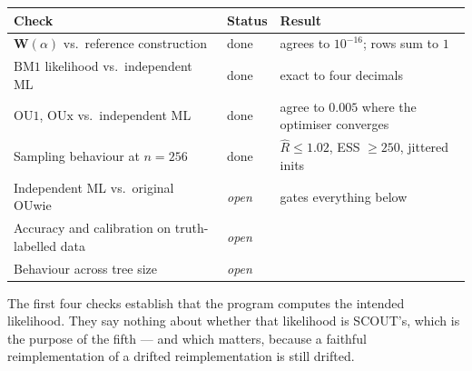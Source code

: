 \documentclass[11pt]{article}
\newcommand{\Wm}{\mathbf{W}}
\newcommand{\BM}{\mathrm{BM1}}
\newcommand{\OUo}{\mathrm{OU1}}
\newcommand{\OUx}{\mathrm{OUx}}
\begin{document}
\begin{center}
\begin{tabular}{@{}llp{6.6cm}@{}}
\toprule
Check & Status & Result \\
\midrule
$\Wm(\alpha)$ vs.\ reference construction & done & agrees to $10^{-16}$; rows sum to $1$ \\
$\BM$ likelihood vs.\ independent ML & done & exact to four decimals \\
$\OUo$, $\OUx$ vs.\ independent ML & done & agree to $0.005$ where the optimiser converges \\
Sampling behaviour at $n = 256$ & done & $\hat{R} \le 1.02$, ESS $\ge 250$, jittered inits \\
Independent ML vs.\ original OUwie & \emph{open} & gates everything below \\
Accuracy and calibration on truth-labelled data & \emph{open} & \\
Behaviour across tree size & \emph{open} & \\
\bottomrule
\end{tabular}
\end{center}

\noindent
The first four checks establish that the program computes the intended likelihood. They say nothing
about whether that likelihood is SCOUT's, which is the purpose of the fifth --- and which matters,
because a faithful reimplementation of a drifted reimplementation is still drifted.
\end{document}

